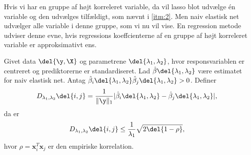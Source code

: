 %
Hvis vi har en gruppe af højt korreleret variable, da vil lasso blot udvælge én variable og den udvælges tilfældigt, som nævnt i \ref{itm:2}.
Men naiv elastisk net udvælger alle variable i denne gruppe, som vi nu vil vise. 
En regression metode udviser denne evne, hvis regressions koeffcienterne af en gruppe af højt korreleret variable er approksimativt ens.

\begin{thm} \label{thm:elastisk_net}
Givet data \(\del{\y, \X}\) og parametrene \(\del{\lambda_1, \lambda_2}\), hvor responsvariablen er centreret og prediktorerne er standardiseret.
Lad \(\hat{\beta} \del{\lambda_1, \lambda_2}\) være estimatet for naiv elastisk net.
Antag \(\hat{\beta}_i \del{\lambda_1, \lambda_2} \hat{\beta}_j \del{\lambda_1, \lambda_2} > 0\).
Definer
\begin{align*}
D_{\lambda_1, \lambda_2} \del{i,j} = \frac{1}{\Vert \y \Vert_1} \vert \hat{\beta}_i \del{\lambda_1, \lambda_2} - \hat{\beta}_j \del{\lambda_1, \lambda_2} \vert,
\end{align*}
da er
\begin{align}
D_{\lambda_1, \lambda_2} \del{i,j} \leq \frac{1}{\lambda_1} \sqrt{2 \del{1-\rho}}, \label{eq:EN5}
\end{align}
hvor \(\rho = \mathbf{x}_i^T \mathbf{x}_j\) er den empiriske korrelation.
\end{thm}

